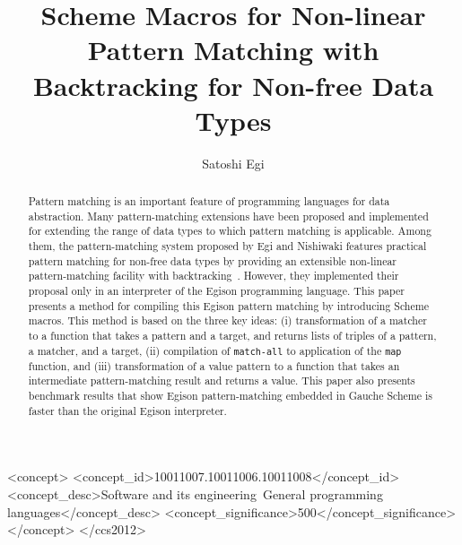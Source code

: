 \documentclass[acmlarge]{acmart}
\newcommand{\new}[1]{\textcolor{blue}{#1}}
\begin{document}
\setlength{\pdfpageheight}{\paperheight}
\setlength{\pdfpagewidth}{\paperwidth}

\title{Scheme Macros for Non-linear Pattern Matching with Backtracking for Non-free Data Types}

\author{Satoshi Egi}

\begin{abstract}
  Pattern matching is an important feature of programming languages for data abstraction.
  Many pattern-matching extensions have been proposed and implemented for extending the range of data types to which pattern matching is applicable.
  Among them, the pattern-matching system proposed by Egi and Nishiwaki features practical pattern matching for non-free data types by providing an extensible non-linear pattern-matching facility with backtracking~\cite{egi2018aplas}.
  However, they implemented their proposal only in an interpreter of the Egison programming language.
  This paper presents a method for compiling this Egison pattern matching by introducing Scheme macros.
  This method is based on the three key ideas: (i) transformation of a matcher to a function that takes a pattern and a target, and returns lists of triples of a pattern, a matcher, and a target, (ii) compilation of \texttt{match-all} to application of the \texttt{map} function, and (iii) transformation of a value pattern to a function that takes an intermediate pattern-matching result and returns a value.
  This paper also presents benchmark results that show Egison pattern-matching embedded in Gauche Scheme is faster than the original Egison interpreter.
\end{abstract}

\begin{CCSXML}
<concept>
<concept_id>10011007.10011006.10011008</concept_id>
<concept_desc>Software and its engineering~General programming languages</concept_desc>
<concept_significance>500</concept_significance>
</concept>
</ccs2012>
\end{CCSXML}

\end{document}
